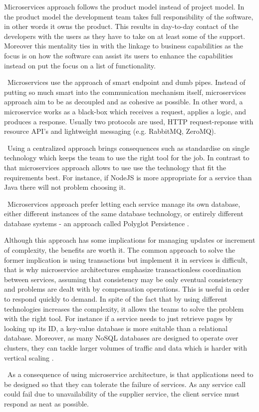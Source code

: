 \begin{description}[style=nextline]
Microservices approach follows the product model instead of project model. In the product model the development team takes full responsibility of the software, in other words it owns the product. This results in day-to-day contact of the developers with the users as they have to take on at least some of the support. Moreover this mentality ties in with the linkage to business capabilities as the focus is on how the software can assist its users to enhance the capabilities instead on put the focus on a list of functionality.
\item[Smart endpoints and dumb pipes] \hfill \
Microservices use the approach of smart endpoint and dumb pipes. Instead of putting so much smart into the communication mechanism itself, microservices approach aim to be as decoupled and as cohesive as possible. In other word, a microservice works as a black-box which receives a request, applies a logic, and produces a response. Usually two protocols are used, HTTP request-reponse with resource API's and lightweight messaging (e.g. RabbitMQ, ZeroMQ).
\item[Decentralized Governance] \hfill \
Using a centralized approach brings consequences such as standardise on single technology which keeps the team to use the right tool for the job. In contrast to that microservices approach allows to use use the technology that fit the requirements best. For instance, if NodeJS is more appropriate for a service than Java there will not problem choosing it.
\item[Decentralized Data Management] \hfill \
Microservices approach prefer letting each service manage its own database, either different instances of the same database technology, or entirely different database systems - an approach called Polyglot Persistence \cite{Leberknight2015}. 

Although this approach has some implications for managing updates or increment of complexity, the benefits are worth it. The common approach to solve the former implication is using transactions but implement it in services is difficult, that is why microservice architectures emphasize transactionless coordination between services, assuming that consistency may be only eventual consistency and problems are dealt with by compensation operations. This is useful in order to respond quickly to demand. In spite of the fact that by using different technologies increases the complexity, it allows the teams to solve the problem with the right tool. For instance if a service needs to just retrieve pages by looking up its ID, a key-value database is more suitable than a relational database. Moreover, as many NoSQL databases are designed to operate over clusters, they can tackle larger volumes of traffic and data which is harder with vertical scaling \cite{Fowler2011}.
\item[Design for failure] \hfill \
As a consequence of using microservice architecture, is that applications need to be designed so that they can tolerate the failure of services. As any service call could fail due to unavailability of the supplier service, the client service must respond as neat as possible.


\end{description}
